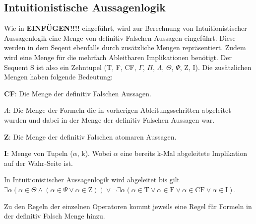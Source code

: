 \subsection{Intuitionistische Aussagenlogik}
Wie in \textbf{EINFÜGEN!!!!} eingeführt, wird zur Berechnung von Intuitionistischer Aussagenlogik eine Menge von definitiv Falschen Aussagen eingeführt. Diese werden in dem Seqent ebenfalls durch zusätzliche Mengen repräsentiert. Zudem wird eine Menge für die mehrfach Ableitbaren Implikationen benötigt. Der Sequent S ist also ein Zehntupel (T, F, CF, $\Gamma$, $\Pi$, $\Lambda$, $\Theta$, $\Psi$, Z, I). Die zusätzlichen Mengen haben folgende Bedeutung:

\begin{description}
\item \textbf{CF}: Die Menge der definitiv Falschen Aussagen.

\item \textbf{$\Lambda$}: Die Menge der Formeln die in vorherigen Ableitungsschritten abgeleitet wurden und dabei in der Menge der definitiv Falschen Aussagen war.

\item \textbf{Z}: Die Menge der definitiv Falschen atomaren Aussagen.

\item \textbf{I}: Menge von Tupeln ($\alpha$, k). Wobei $\alpha$ eine bereits k-Mal abgeleitete Implikation auf der Wahr-Seite ist.
\end{description}

In Intuitionistischer Aussagenlogik wird abgeleitet bis gilt $\exists\alpha(\alpha\in\Theta\wedge(\alpha\in\Psi\vee\alpha\in\textrm{Z}))\vee\neg\exists\alpha(\alpha\in\textrm{T}\vee\alpha\in\textrm{F}\vee\alpha\in\textrm{CF}\vee\alpha\in\textrm{I})$.

Zu den Regeln der einzelnen Operatoren kommt jeweils eine Regel für Formeln in der definitiv Falsch Menge hinzu.









